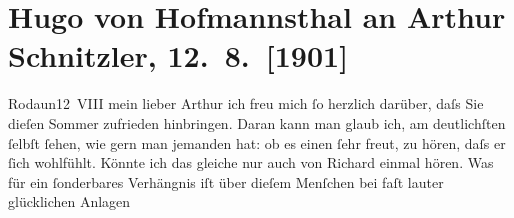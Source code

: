 

         
         \renewcommand{\erwaehntePersonen}{Personen: Richard Beer-Hofmann, Hugo von Hofmannsthal, Gertrude von Hofmannsthal}
         \renewcommand{\erwaehnteInstitutionen}{Institutionen: Westbahnstrecke}
         \renewcommand{\erwaehnteOrte}{Orte: Heiligenkreuz, Niederösterreich, Pressbaum, Rodaun, Sulz im Wienerwald, Tullnerbach, Wien}
         \renewcommand{\erwaehnteWerke}{Werke: Pompilia oder das Leben}
               \section[Hugo von Hofmannsthal an Arthur Schnitzler, 12. 8. {[}1901{]}]{ Hugo von Hofmannsthal an Arthur Schnitzler, 12. 8. {[}1901{]}}\nopagebreak{}\rehead{ }\begin{ledgroupsized}[t]{13cm}\normalsize\beginnumbering{} \toendnotes[C]{\smallbreak\pagebreak[2]} 
\toendnotes[C]{\smallbreak}\pstart
           \raggedleft{}{\pb}Rodaun12 VIII\pend
           \pstart{}mein lieber Arthur \pend\pstart
           ich freu mich ſo herzlich darüber, daſs Sie dieſen Sommer zufrieden hinbringen. Daran
               kann man glaub ich, am deutlichſten ſelbſt ſehen, wie gern man jemanden hat: ob es
               einen ſehr freut, zu hören, daſs er ſich wohlfühlt. Könnte ich das gleiche nur auch
               von Richard einmal hören. Was für ein
               ſonderbares Verhängnis iſt über dieſem Menſchen bei faſt lauter glücklichen Anlagen

\end{ledgroupsized}
